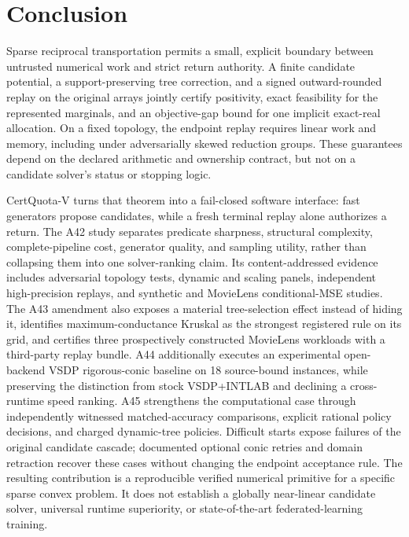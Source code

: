 \documentclass[smallextended,envcountsect]{svjour3}
\begin{document}
\section{Conclusion}

Sparse reciprocal transportation permits a small, explicit boundary between
untrusted numerical work and strict return authority.  A finite candidate
potential, a support-preserving tree correction, and a signed outward-rounded
replay on the original arrays jointly certify positivity, exact feasibility for
the represented marginals, and an objective-gap bound for one implicit
exact-real allocation.  On a fixed topology, the endpoint replay requires
linear work and memory, including under adversarially skewed reduction groups.
These guarantees depend on the declared arithmetic and ownership contract, but
not on a candidate solver's status or stopping logic.

CertQuota-V turns that theorem into a fail-closed software interface: fast
generators propose candidates, while a fresh terminal replay alone authorizes a
return.  The A42 study separates predicate sharpness, structural complexity,
complete-pipeline cost, generator quality, and sampling utility, rather than
collapsing them into one solver-ranking claim.  Its content-addressed evidence
includes adversarial topology tests, dynamic and scaling panels, independent
high-precision replays, and synthetic and MovieLens conditional-MSE studies.
The A43 amendment also exposes a material tree-selection effect instead of
hiding it, identifies maximum-conductance Kruskal as the strongest registered
rule on its grid, and certifies three prospectively constructed MovieLens
workloads with a third-party replay bundle.
A44 additionally executes an experimental open-backend VSDP rigorous-conic
baseline on 18 source-bound instances, while preserving the distinction from
stock VSDP+INTLAB and declining a cross-runtime speed ranking.
A45 strengthens the computational case through independently witnessed
matched-accuracy comparisons, explicit rational policy decisions, and charged
dynamic-tree policies. Difficult starts expose failures of the original
candidate cascade; documented optional conic retries and domain retraction
recover these cases without changing the endpoint acceptance rule.
The resulting contribution is a reproducible verified numerical primitive for
a specific sparse convex problem.  It does not establish a globally
near-linear candidate solver, universal runtime superiority, or
state-of-the-art federated-learning training.

\appendix





\clearpage

\end{document}
